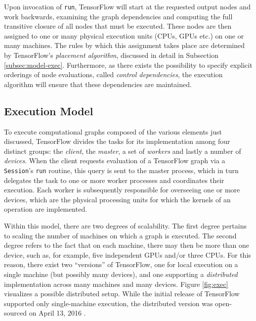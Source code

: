 Upon invocation of \texttt{run}, TensorFlow will start at the requested output
nodes and work backwards, examining the graph dependencies and computing the
full transitive closure of all nodes that must be executed. These nodes are then
assigned to one or many physical execution units (CPUs, GPUs etc.) on one or
many machines. The rules by which this assignment takes place are determined by
TensorFlow's \emph{placement algorithm}, discussed in detail in Subsection
\ref{subsec:model-exec}. Furthermore, as there exists the possibility to specify
explicit orderings of node evaluations, called \emph{control dependencies}, the
execution algorithm will ensure that these dependencies are maintained.

\subsection{Execution Model}\label{sec:model-exec}

To execute computational graphs composed of the various elements just discussed,
TensorFlow divides the tasks for its implementation among four distinct groups:
the \emph{client}, the \emph{master}, a set of \emph{workers} and lastly a
number of \emph{devices}. When the client requests evaluation of a TensorFlow
graph via a \texttt{Session}'s \texttt{run} routine, this query is sent to the
master process, which in turn delegates the task to one or more worker processes
and coordinates their execution. Each worker is subsequently responsible for
overseeing one or more devices, which are the physical processing units for
which the kernels of an operation are implemented.

Within this model, there are two degrees of scalability. The first degree
pertains to scaling the number of machines on which a graph is executed. The
second degree refers to the fact that on each machine, there may then be more
than one device, such as, for example, five independent GPUs and/or three
CPUs. For this reason, there exist two ``versions'' of TensorFlow, one for local
execution on a single machine (but possibly many devices), and one supporting a
\emph{distributed} implementation across many machines and many devices. Figure
\ref{fig:exec} visualizes a possible distributed setup. While the initial
release of TensorFlow supported only single-machine execution, the distributed
version was open-sourced on April 13, 2016 \cite{tensorflowdist}.

